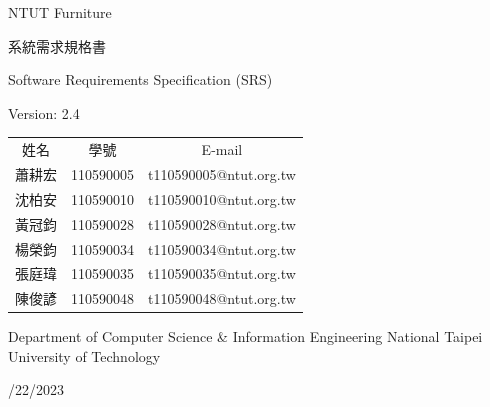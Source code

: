 \documentclass[a4paper, 12pt]{article}
\def\myProjectName{NTUT Furniture}
\def\myVersion{2.4}
\newcommand\TwentyTitle{\fontsize{20pt}{24pt}\selectfont}
\newcommand\EighteenTitle{\fontsize{18pt}{20pt}\selectfont}
\newcommand\SixteenTitle{\fontsize{16pt}{18pt}\selectfont}
\begin{document}
\thispagestyle{empty}
\begin{center}
    {\TwentyTitle \myProjectName \par}
    \vspace{6cm}
    {\TwentyTitle 系統需求規格書 \par}
    {\EighteenTitle Software Requirements Specification (SRS) \par}
    {\SixteenTitle Version: \myVersion \par}
    \vspace{4cm}
    {\SixteenTitle
    \renewcommand{\arraystretch}{1.3} %
    \begin{tabular}{ccc}
      姓名 & 學號 & E-mail \\[0.2em]
      蕭耕宏& 110590005& t110590005@ntut.org.tw \\
      沈柏安& 110590010& t110590010@ntut.org.tw \\
      黃冠鈞& 110590028& t110590028@ntut.org.tw \\
      楊榮鈞& 110590034& t110590034@ntut.org.tw \\
      張庭瑋& 110590035& t110590035@ntut.org.tw \\
      陳俊諺& 110590048& t110590048@ntut.org.tw \\
    \end{tabular}
    \renewcommand{\arraystretch}{1} %
    \par}
    \vspace{2cm}
    {\SixteenTitle Department of Computer Science \& Information Engineering National Taipei University of Technology \par}
    \vspace{16pt}
    {\SixteenTitle 11/22/2023 \par}
\end{center}
\clearpage

\renewcommand{\contentsname}{目錄 (Table of Contents)}
\tableofcontents
\newpage



\end{document}
